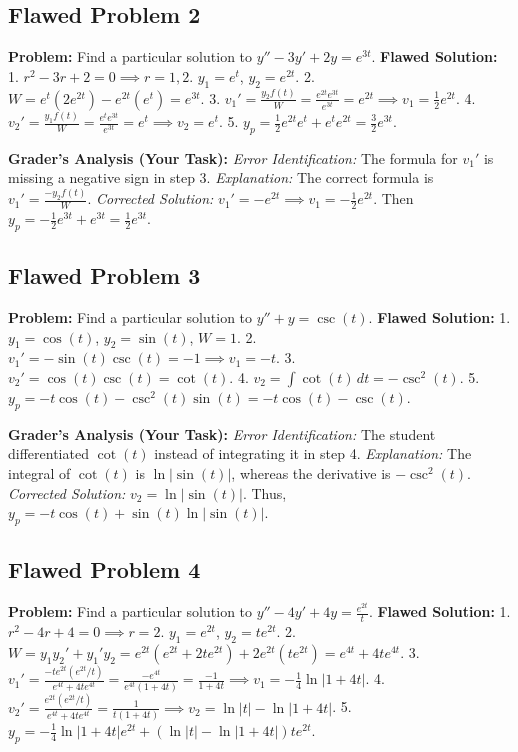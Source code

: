 \documentclass{article}
\begin{document}
\subsection{Flawed Problem 2}
\textbf{Problem:} Find a particular solution to $y'' - 3y' + 2y = e^{3t}$.
\textbf{Flawed Solution:}
1. $r^2 - 3r + 2 = 0 \implies r = 1, 2$. $y_1 = e^t$, $y_2 = e^{2t}$.
2. $W = e^t(2e^{2t}) - e^{2t}(e^t) = e^{3t}$.
3. $v_1' = \frac{y_2 f(t)}{W} = \frac{e^{2t} e^{3t}}{e^{3t}} = e^{2t} \implies v_1 = \frac{1}{2} e^{2t}$.
4. $v_2' = \frac{y_1 f(t)}{W} = \frac{e^t e^{3t}}{e^{3t}} = e^t \implies v_2 = e^t$.
5. $y_p = \frac{1}{2} e^{2t} e^t + e^t e^{2t} = \frac{3}{2} e^{3t}$.

\textbf{Grader's Analysis (Your Task):}
\textit{Error Identification:} The formula for $v_1'$ is missing a negative sign in step 3.
\textit{Explanation:} The correct formula is $v_1' = \frac{-y_2 f(t)}{W}$.
\textit{Corrected Solution:} $v_1' = -e^{2t} \implies v_1 = -\frac{1}{2} e^{2t}$. Then $y_p = -\frac{1}{2} e^{3t} + e^{3t} = \frac{1}{2} e^{3t}$.

\subsection{Flawed Problem 3}
\textbf{Problem:} Find a particular solution to $y'' + y = \csc(t)$.
\textbf{Flawed Solution:}
1. $y_1 = \cos(t)$, $y_2 = \sin(t)$, $W = 1$.
2. $v_1' = -\sin(t) \csc(t) = -1 \implies v_1 = -t$.
3. $v_2' = \cos(t) \csc(t) = \cot(t)$.
4. $v_2 = \int \cot(t) \, dt = -\csc^2(t)$.
5. $y_p = -t \cos(t) - \csc^2(t) \sin(t) = -t \cos(t) - \csc(t)$.

\textbf{Grader's Analysis (Your Task):}
\textit{Error Identification:} The student differentiated $\cot(t)$ instead of integrating it in step 4.
\textit{Explanation:} The integral of $\cot(t)$ is $\ln\left|\sin(t)\right|$, whereas the derivative is $-\csc^2(t)$.
\textit{Corrected Solution:} $v_2 = \ln\left|\sin(t)\right|$. Thus, $y_p = -t \cos(t) + \sin(t) \ln\left|\sin(t)\right|$.

\subsection{Flawed Problem 4}
\textbf{Problem:} Find a particular solution to $y'' - 4y' + 4y = \frac{e^{2t}}{t}$.
\textbf{Flawed Solution:}
1. $r^2 - 4r + 4 = 0 \implies r = 2$. $y_1 = e^{2t}$, $y_2 = t e^{2t}$.
2. $W = y_1 y_2' + y_1' y_2 = e^{2t}(e^{2t} + 2t e^{2t}) + 2e^{2t}(t e^{2t}) = e^{4t} + 4t e^{4t}$.
3. $v_1' = \frac{-t e^{2t} (e^{2t}/t)}{e^{4t} + 4t e^{4t}} = \frac{-e^{4t}}{e^{4t}(1+4t)} = \frac{-1}{1+4t} \implies v_1 = -\frac{1}{4} \ln\left|1+4t\right|$.
4. $v_2' = \frac{e^{2t} (e^{2t}/t)}{e^{4t} + 4t e^{4t}} = \frac{1}{t(1+4t)} \implies v_2 = \ln|t| - \ln\left|1+4t\right|$.
5. $y_p = -\frac{1}{4} \ln\left|1+4t\right| e^{2t} + (\ln|t| - \ln\left|1+4t\right|) t e^{2t}$.
\end{document}
